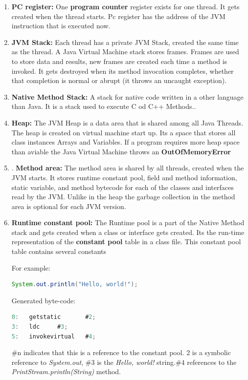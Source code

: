 \begin{enumerate}
\item \textbf{PC register:} One \textbf{program counter} register exists for one thread. It gets created when the thread starts. Pc register has the address of the JVM instruction that is executed now.\cite{javaJVM}
 
\item \textbf{JVM Stack:} Each thread has a private JVM Stack, created the same time as the thread. A Java Virtual Machine stack stores frames. Frames are used to store data and results, new frames are created each time a method is invoked. It gets destroyed when its method invocation completes, whether that completion is normal or abrupt (it throws an uncaught exception). \cite{javaVMOracle}

\item \textbf{Native Method Stack:}
A stack for native code written in a other language than Java. It is a stack used to execute C od C++ Methods.\cite{javaJVM}.  

\item \textbf{Heap:}
The JVM Heap is a data area that is shared among all Java Threads. The heap is created on virtual machine start up.
Its a space that stores all class instances Arrays and Variables. If a program requires more heap space than aviable the Java Virtual Machine throws an \textbf{OutOfMemoryError}\cite{javaVMOracle}

\item. \textbf{Method area:} The method area is shared by all threads, created when the JVM starts. It stores runtime constant pool, field and method information, static variable, and method bytecode for each of the classes and interfaces read by the JVM. Unlike in the heap the garbage collection in the method area is optional for each JVM version. \cite{javaJVM}

\item \textbf{Runtime constant pool:}
The Runtime pool is a part of the Native Method stack and gets created when a class or interface gets created. Its the run-time representation of the \textbf{constant pool} table in a class file. This constant pool table contains several constants \cite{javaVMPaper}

For example:
\begin{lstlisting}[language=Java, caption=Java example Code]
System.out.println("Hello, world!");
\end{lstlisting}
Generated byte-code:
\begin{lstlisting}[language=Java, caption= JVM bytecode]
0:   getstatic       #2;               
3:   ldc     #3;                         
5:   invokevirtual   #4; 
\end{lstlisting}
\#n indicates that this is a reference to the constant pool.
2 is a symbolic reference to \textit{System.out}, \#3 is the \textit{Hello, world!} string.\#4 references to the \textit{PrintStream.println(String)} method.
\cite{javaVmstover}  
\end{enumerate}
